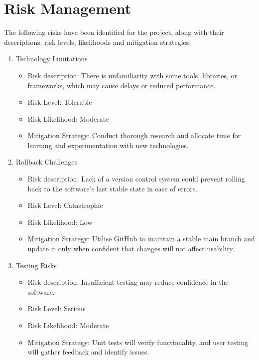 \documentclass[10pt]{article}
\begin{document}
\section{Risk Management}
    The following risks have been identified for the project, along with their descriptions, risk levels, likelihoods and mitigation strategies.
        \begin{enumerate}
             
       
        \item{Technology Limitations}
        \begin{itemize}
            \item Risk description: There is unfamiliarity with some tools, libraries, or frameworks, which may cause delays or reduced performance. 
            \item Risk Level: Tolerable
            \item Risk Likelihood: Moderate
            \item Mitigation Strategy: Conduct thorough research and allocate time for learning and experimentation with new technologies.
        \end{itemize}

        \item{Rollback Challenges}
        \begin{itemize}
            \item Risk description: Lack of a version control system could prevent rolling back to the software's last stable state in case of errors.
            \item Risk Level: Catastrophic
            \item Risk Likelihood: Low
            \item Mitigation Strategy: Utilise GitHub to maintain a stable main branch and update it only when confident that changes will not affect usability. 
        \end{itemize}

        \item{Testing Risks}
        \begin{itemize}
            \item Risk description: Insufficient testing may reduce confidence in the software.
            \item Risk Level: Serious
            \item Risk Likelihood: Moderate
            \item Mitigation Strategy: Unit tests will verify functionality, and user testing will gather feedback and identify issues.
        \end{itemize}


\end{enumerate}
\end{document}

